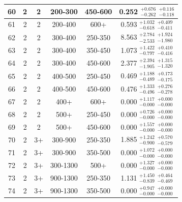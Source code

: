 \begin{table}[htbp]
\begin{centering}
\begin{tabular}{|c|c|c|c|c||c|}
\hline
60 &               2 &               2 &         200-300 &         450-600 & 0.252 $^{+0.676}_{-0.262}$ $^{+0.116}_{-0.118}$ \\ 
\hline
61 &               2 &               2 &         200-400 &            600+ & 0.593 $^{+1.032}_{-0.618}$ $^{+0.409}_{-0.411}$ \\ 
\hline
62 &               2 &               2 &         300-400 &         250-350 & 8.563 $^{+2.784}_{-2.533}$ $^{+1.924}_{-1.980}$ \\ 
\hline
63 &               2 &               2 &         300-400 &         350-450 & 1.073 $^{+1.422}_{-0.797}$ $^{+0.410}_{-0.416}$ \\ 
\hline
64 &               2 &               2 &         300-400 &         450-600 & 2.377 $^{+2.394}_{-1.905}$ $^{+1.315}_{-1.320}$ \\ 
\hline
65 &               2 &               2 &         400-500 &         250-450 & 0.469 $^{+1.188}_{-0.489}$ $^{+0.173}_{-0.175}$ \\ 
\hline
66 &               2 &               2 &         400-500 &         450-600 & 0.476 $^{+1.333}_{-0.496}$ $^{+0.276}_{-0.278}$ \\ 
\hline
67 &               2 &               2 &            400+ &            600+ & 0.000 $^{+1.117}_{-0.000}$ $^{+0.000}_{-0.000}$ \\ 
\hline
68 &               2 &               2 &            500+ &         250-450 & 0.000 $^{+0.726}_{-0.000}$ $^{+0.000}_{-0.000}$ \\ 
\hline
69 &               2 &               2 &            500+ &         450-600 & 0.000 $^{+1.557}_{-0.000}$ $^{+0.000}_{-0.000}$ \\ 
\hline
70 &               2 &              3+ &         300-900 &         250-350 & 1.885 $^{+1.242}_{-0.900}$ $^{+0.570}_{-0.579}$ \\ 
\hline
71 &               2 &              3+ &         300-900 &         350-500 & 0.000 $^{+1.072}_{-0.000}$ $^{+0.000}_{-0.000}$ \\ 
\hline
72 &               2 &              3+ &        300-1300 &            500+ & 0.000 $^{+1.327}_{-0.000}$ $^{+0.000}_{-0.000}$ \\ 
\hline
73 &               2 &              3+ &        900-1300 &         250-350 & 1.131 $^{+1.450}_{-0.839}$ $^{+0.464}_{-0.469}$ \\ 
\hline
74 &               2 &              3+ &        900-1300 &         350-500 & 0.000 $^{+0.947}_{-0.000}$ $^{+0.000}_{-0.000}$ \\ 

\end{tabular}
\end{centering}
\end{table}
